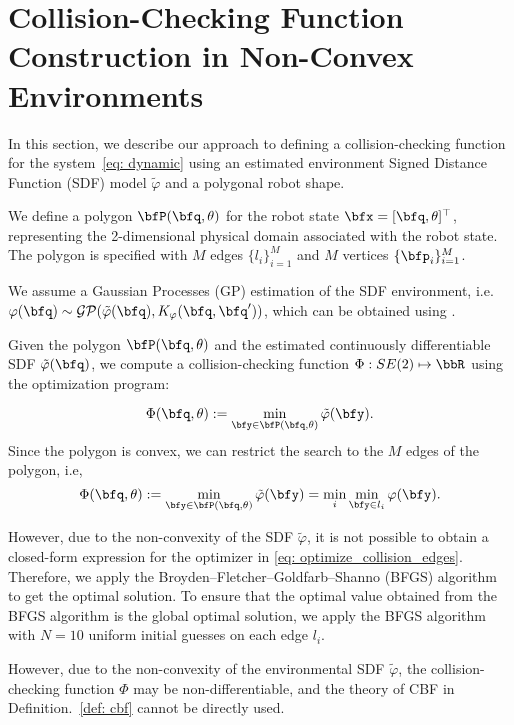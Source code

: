 \section{Collision-Checking Function Construction in Non-Convex Environments}
\label{sec: method}

In this section, we describe our approach to defining a collision-checking function for the system~\eqref{eq: dynamic} using an estimated environment Signed Distance Function (SDF) model $\tilde{\varphi}$ and a polygonal robot shape.

We define a polygon $\bfP(\bfq, \theta)$ for the robot state $\bfx = [\bfq, \theta]^\top$, representing the 2-dimensional physical domain associated with the robot state. The polygon is specified with $M$ edges $\{l_i\}_{i=1}^M$ and $M$ vertices $\{\bfp_i\}_{i=1}^M$.


We assume a Gaussian Processes (GP) estimation of the SDF environment, i.e. $\varphi(\bfq) \sim \mathcal{GP}(\tilde{\varphi}(\bfq),K_\varphi(\bfq,\bfq'))$, which can be obtained using \cite{gpis_lee}. 

Given the polygon $\bfP(\bfq, \theta)$ and the estimated continuously differentiable SDF $\tilde{\varphi}(\bfq)$, we compute a collision-checking function $\Phi: SE(2) \mapsto \bbR$ using the optimization program:

%
\begin{equation}
\label{eq: optimize_collision_function}
    \Phi(\bfq, \theta) := \min_{\bfy \in \bfP(\bfq, \theta)} \tilde{\varphi}(\bfy).
\end{equation}
%
Since the polygon is convex, we can restrict the search to the $M$ edges of the polygon, i.e, 
\begin{equation}
\label{eq: optimize_collision_edges}
    \Phi(\bfq, \theta) := \min_{\bfy \in \bfP(\bfq, \theta)} \tilde{\varphi}(\bfy) = \min_{i} \min_{\bfy \in l_i} \varphi(\bfy).
\end{equation}

However, due to the non-convexity of the SDF $\tilde{\varphi}$, it is not possible to obtain a closed-form expression for the optimizer in \eqref{eq: optimize_collision_edges}.
Therefore, we apply the Broyden–Fletcher–Goldfarb–Shanno (BFGS) \cite{NoceWrig06, Fletcher1988PracticalMO} algorithm to get the optimal solution. To ensure that the optimal value obtained from the BFGS algorithm is the global optimal solution, we apply the BFGS algorithm with $N = 10$ uniform  initial guesses on each edge $l_i$.

However, due to the non-convexity of the environmental SDF $\tilde{\varphi}$, the collision-checking function $\Phi$ may be non-differentiable, and the theory of CBF in Definition.~\ref{def: cbf} cannot be directly used.
















